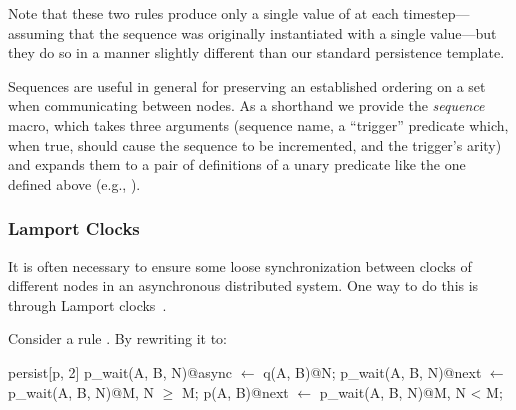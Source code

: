 \noindent Note that these two rules produce only a single value of
 at each timestep---assuming that the sequence was originally
instantiated with a single value---but they do so in a manner slightly
different than our standard persistence template.

Sequences are useful in general for preserving an established ordering on a set
when communicating between nodes.  As a shorthand we provide the {\em sequence}
macro, which takes three arguments (sequence name, a ``trigger'' predicate
which, when true, should cause the sequence to be incremented, and the
trigger's arity) and expands them to a pair of definitions of a unary predicate
like the one defined above (e.g., ).

\subsubsection{Lamport Clocks}
\label{sec:lamport}
It is often necessary to ensure some loose synchronization between clocks of
different nodes in an asynchronous distributed system.  One way to do this is
through Lamport clocks~\cite{timeclocks}.

Consider a rule .  By rewriting it
to:

\begin{Dedalus}
persist[p, 2]
p\_wait(A, B, N)@async \(\leftarrow\) q(A, B)@N;
p\_wait(A, B, N)@next \(\leftarrow\) p\_wait(A, B, N)@M, N \(\ge\) M;
p(A, B)@next \(\leftarrow\) p\_wait(A, B, N)@M, N < M;
\end{Dedalus}

